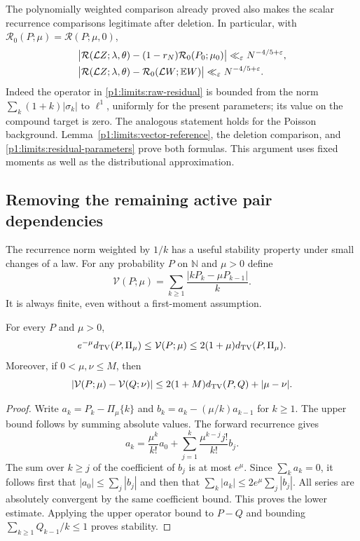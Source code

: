The polynomially weighted comparison already proved also makes
the scalar recurrence comparisons legitimate after deletion.
In particular, with
$\mathcal R_0(P;\mu)=\mathcal R(P;\mu,0)$,
\begin{align}
 &\big|\mathcal R(\mathcal L Z;\lambda,\theta)
       -(1-r_N)\mathcal R_0(P_0;\mu_0)\big|
       \ll_\varepsilon N^{-4/5+\varepsilon},
       \label{p1:limits:background-residual}\\
 &\big|\mathcal R(\mathcal L Z;\lambda,\theta)
       -\mathcal R_0(\mathcal L W;\mathbb E W)\big|
       \ll_\varepsilon N^{-4/5+\varepsilon}.
       \label{p1:limits:erased-residual}
\end{align}
Indeed the operator in \eqref{p1:limits:raw-residual} is bounded
from the norm $\sum_k(1+k)|\sigma_k|$ to $\ell^1$, uniformly
for the present parameters; its value on the compound target
is zero.  The analogous statement holds for the Poisson
background.  Lemma~\ref{p1:limits:vector-reference}, the deletion
comparison, and \eqref{p1:limits:residual-parameters} prove
both formulas.  This argument uses fixed moments as well as
the distributional approximation.

\subsection{Removing the remaining active pair dependencies}

The recurrence norm weighted by $1/k$ has a useful stability
property under small changes of a law.  For any probability
$P$ on $\mathbb N$ and $\mu>0$ define
\[
 \mathcal V(P;\mu)=\sum_{k\ge1}\frac{|kP_k-\mu P_{k-1}|}{k}.
\]
It is always finite, even without a first-moment assumption.

\begin{lemma}
\label{p1:limits:weighted-residual}
For every $P$ and $\mu>0$,
\begin{equation}
 e^{-\mu}d_{\mathrm{TV}}(P,\Pi_\mu)\le\mathcal V(P;\mu)
       \le2(1+\mu)d_{\mathrm{TV}}(P,\Pi_\mu).
 \label{p1:limits:weighted-equivalence}
\end{equation}
Moreover, if $0<\mu,\nu\le M$, then
\begin{equation}
 |\mathcal V(P;\mu)-\mathcal V(Q;\nu)|
       \le2(1+M)d_{\mathrm{TV}}(P,Q)+|\mu-\nu|.
 \label{p1:limits:weighted-stability}
\end{equation}
\end{lemma}
\begin{proof}
Write $a_k=P_k-\Pi_\mu\{k\}$ and
$b_k=a_k-(\mu/k)a_{k-1}$ for $k\ge1$.
The upper bound follows by summing absolute values.
The forward recurrence gives
\[
 a_k=\frac{\mu^k}{k!}a_0+
           \sum_{j=1}^k\frac{\mu^{k-j}j!}{k!}b_j.
\]
The sum over $k\ge j$ of the coefficient of $b_j$ is at most
$e^\mu$.  Since $\sum_ka_k=0$, it follows first that
$|a_0|\le\sum_j|b_j|$ and then that
$\sum_k|a_k|\le2e^\mu\sum_j|b_j|$.
All series are absolutely convergent by the same coefficient
bound.  This proves the lower estimate.  Applying the upper
operator bound to $P-Q$ and bounding
$\sum_{k\ge1}Q_{k-1}/k\le1$ proves stability.
\end{proof}

